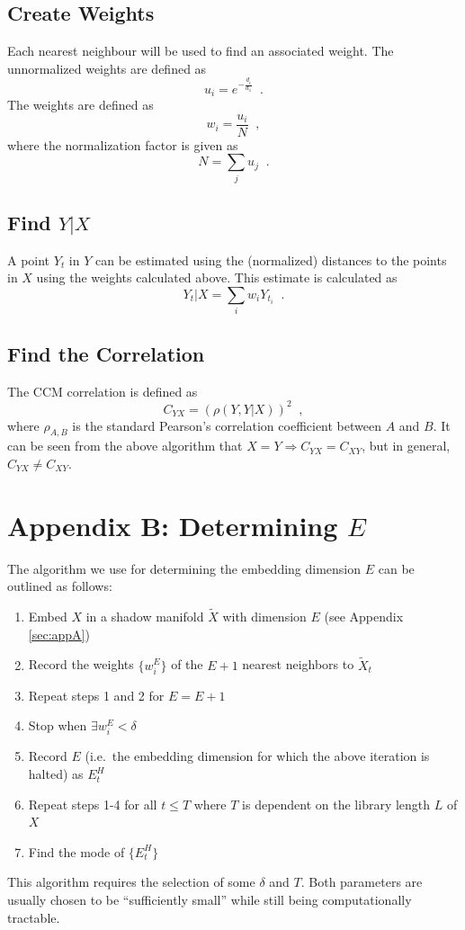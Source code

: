 \documentclass[a4paper,11pt]{article}
\begin{document}
\subsection{Create Weights}
Each nearest neighbour will be used to find an associated weight.  The unnormalized weights are defined as
$$
u_i = e^{-\frac{d_i}{d_1}}\;\;.
$$
The weights are defined as
$$
w_i = \frac{u_i}{N}\;\;,
$$
where the normalization factor is given as
$$
N = \sum_j u_j\;\;.
$$

\subsection{Find $Y|X$}
A point $Y_t$ in $Y$ can be estimated using the (normalized) distances to the points in $X$ using the weights calculated above.  This estimate is calculated as
$$
Y_t|X = \sum_i w_i Y_{t_i}\;\;.
$$

\subsection{Find the Correlation}
The CCM correlation is defined as 
$$
C_{YX} = \left(\rho\left(Y,Y|X\right)\right)^2\;\;,
$$
where $\rho_{A,B}$ is the standard Pearson's correlation coefficient between $A$ and $B$.  It can be seen from the above algorithm that $X=Y \Rightarrow C_{YX}=C_{XY}$, but in general, $C_{YX}\neq C_{XY}$.  

\section{Appendix B: Determining $E$}
\label{sec:appB}
The algorithm we use for determining the embedding dimension $E$ can be outlined as follows:
\begin{enumerate}
\item Embed $X$ in a shadow manifold $\tilde{X}$ with dimension $E$ (see Appendix \ref{sec:appA})
\item Record the weights $\{w^E_i\}$ of the $E+1$ nearest neighbors to $\tilde{X}_t$ 
\item Repeat steps 1 and 2 for $E=E+1$
\item Stop when $\exists w^E_i < \delta$
\item Record $E$ (i.e.\ the embedding dimension for which the above iteration is halted) as $E^H_t$
\item Repeat steps 1-4 for all $t\le T$ where $T$ is dependent on the library length $L$ of $X$ 
\item Find the mode of $\{E_t^H\}$
\end{enumerate}
This algorithm requires the selection of some $\delta$ and $T$.  Both parameters are usually chosen to be ``sufficiently small'' while still being computationally tractable.  
\end{document}
